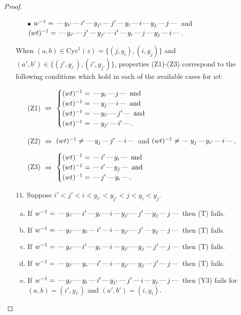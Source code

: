 \documentclass[10pt]{article}
\theoremstyle{definition}
\theoremstyle{definition}
\def\dash{\text{\hspace{0.5mm}---\hspace{0.5mm}}}
\def\Cyc{\mathrm{Cyc}}
\begin{document}
\begin{proof}
\begin{enumerate}
\begin{enumerate}
\item[$\bullet$] $w^{-1} = \dash y_{i'}\dash i'\dash y_{j'}\dash j'\dash y_i\dash i\dash y_j\dash j\dash $ and $(wt)^{-1} = \dash y_{i'}\dash j'\dash y_{j'}\dash i'\dash y_i\dash j\dash y_j\dash i\dash $.
\end{enumerate}
When $(a,b)\in\Cyc^1(z)=\{(j,y_i),(i,y_j)\}$ and $(a',b')\in\{(j',y_{i'}),(i',y_{j'})\}$,
properties (Z1)-(Z3) correspond to the following conditions which
hold in each of the available cases for $wt$:
\begin{enumerate}
\item[](Z1) $\Leftrightarrow$ $\begin{cases}\text{$(wt)^{-1} = \dash y_i \dash j \dash$}\text{ and }\\
\text{$(wt)^{-1} = \dash y_j \dash i \dash$}\text{ and }\\
\text{$(wt)^{-1} = \dash y_{i'} \dash j' \dash$}\text{ and }\\
\text{$(wt)^{-1} = \dash y_{j'} \dash i' \dash$}.\end{cases}$
\item[](Z2) $\Leftrightarrow$ $(wt)^{-1} \neq \dash y_j \dash j' \dash i \dash$ and $(wt)^{-1}\neq \dash y_j \dash y_{i'} \dash i \dash$.
\item[](Z3) $\Leftrightarrow$ $\begin{cases}\text{$(wt)^{-1} = \dash i' \dash y_i \dash$}\text{ and }\\
\text{$(wt)^{-1} = \dash i' \dash y_j \dash$}\text{ and }\\
\text{$(wt)^{-1} = \dash j' \dash y_i \dash$}.\end{cases}$
\end{enumerate}
\item[$11$.] Suppose $i' < j' < i < y_{i'} < y_{j'} < j < y_i < y_j$.
\begin{enumerate}[(a)]
\item If $w^{-1} = \dash y_{i'}\dash i'\dash y_i\dash i\dash y_{j'}\dash j'\dash y_j\dash j\dash $ then (T) fails.
\item If $w^{-1} = \dash y_{i'}\dash y_i\dash i'\dash i\dash y_{j'}\dash j'\dash y_j\dash j\dash $ then (T) fails.
\item If $w^{-1} = \dash y_{i'}\dash i'\dash y_i\dash i\dash y_{j'}\dash y_j\dash j'\dash j\dash $ then (T) fails.
\item If $w^{-1} = \dash y_{i'}\dash y_i\dash i'\dash i\dash y_{j'}\dash y_j\dash j'\dash j\dash $ then (T) fails.
\item If $w^{-1} = \dash y_{i'}\dash y_i\dash i'\dash y_{j'}\dash j'\dash i\dash y_j\dash j\dash $ then (Y3) fails for $(a,b)=(i',y_{i'})$ and $(a',b')=(i,y_i)$.

\end{enumerate}
\end{enumerate}
\end{proof}
\end{document}
